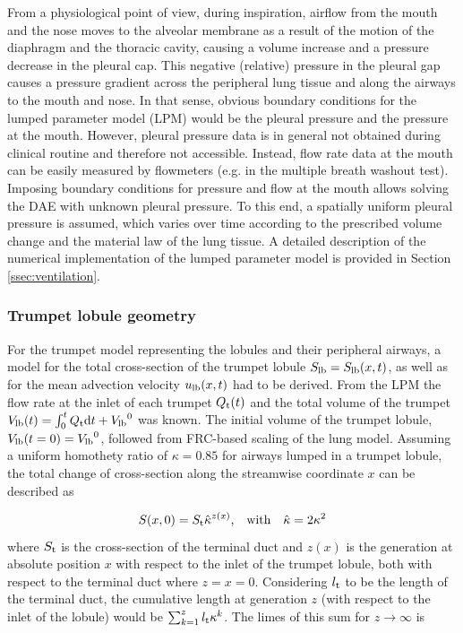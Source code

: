 From a physiological point of view, during inspiration, airflow from the mouth and the nose moves to the alveolar membrane as a result of the motion of the diaphragm and the thoracic cavity, causing a volume increase and a pressure decrease in the pleural cap.
This negative (relative) pressure in the pleural gap causes a pressure gradient across the peripheral lung tissue and along the airways to the mouth and nose.
In that sense, obvious boundary conditions for the lumped parameter model (LPM) would be the pleural pressure and the pressure at the mouth. However, pleural pressure data is in general not obtained during clinical routine and therefore not accessible.
Instead, flow rate data at the mouth can be easily measured by flowmeters (e.g. in the multiple breath washout test).
Imposing boundary conditions for pressure and flow at the mouth allows solving the DAE with unknown pleural pressure.
To this end, a spatially uniform pleural pressure is assumed, which varies over time according to the prescribed volume change and the material law of the lung tissue.
A detailed description of the numerical implementation of the lumped parameter model is provided in Section \ref{ssec:ventilation}.


\subsubsection{Trumpet lobule geometry} \label{ssec:trumpet_lobule_geometry}
For the trumpet model representing the lobules and their peripheral airways, a model for the total cross-section of the trumpet lobule $S_{\mathrm{lb}} = S_{\mathrm{lb}}(x,t)$, as well as for the mean advection velocity $u_{\mathrm{lb}}(x,t)$ had to be derived.
From the LPM the flow rate at the inlet of each trumpet $Q_{\mathrm{t}}(t)$ and the total volume of the trumpet $V_{\mathrm{lb}}(t) = \int_0^t Q_{\mathrm{t}}\mathrm{d} t + {V_{\mathrm{lb}}}^0$ was known.
The initial volume of the trumpet lobule, $V_{\mathrm{lb}}(t=0) = {V_{\mathrm{lb}}}^0$, followed from FRC-based scaling of the lung model.
Assuming a uniform homothety ratio of $\kappa = 0.85$ \cite{Weibel1963} for airways lumped in a trumpet lobule, the total change of cross-section along the streamwise coordinate $x$ can be described as

\begin{equation}\label{eqn:crosssection}
S(x,0) = S_{\mathrm{t}}\hat{\kappa}^{z(x)}\text{,} \quad\text{with}\quad \hat{\kappa} = 2\kappa^2
\end{equation}
where $S_{\mathrm{t}}$ is the cross-section of the terminal duct and $z(x)$ is the generation at absolute position $x$ with respect to the inlet of the trumpet lobule, both with respect to the terminal duct where $z = x = 0$.
Considering $l_{\mathrm{t}}$ to be the length of the terminal duct, the cumulative length at generation $z$ (with respect to the inlet of the lobule) would be $\sum_{k=1}^z l_{\mathrm{t}}\kappa^k$.
The limes of this sum for $z\rightarrow\infty$ is

